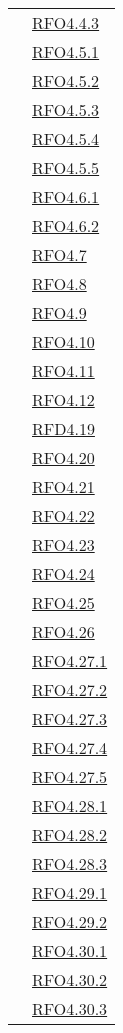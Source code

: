 \begin{longtable}{|>{\centering}m{5cm}|m{5cm}<{\centering}|}
& \hyperlink{RFO4.4.3}{RFO4.4.3}\\
& \hyperlink{RFO4.5.1}{RFO4.5.1}\\
& \hyperlink{RFO4.5.2}{RFO4.5.2}\\
& \hyperlink{RFO4.5.3}{RFO4.5.3}\\
& \hyperlink{RFO4.5.4}{RFO4.5.4}\\
& \hyperlink{RFO4.5.5}{RFO4.5.5}\\
& \hyperlink{RFO4.6.1}{RFO4.6.1}\\
& \hyperlink{RFO4.6.2}{RFO4.6.2}\\
& \hyperlink{RFO4.7}{RFO4.7}\\
& \hyperlink{RFO4.8}{RFO4.8}\\
& \hyperlink{RFO4.9}{RFO4.9}\\
& \hyperlink{RFO4.10}{RFO4.10}\\
& \hyperlink{RFO4.11}{RFO4.11}\\
& \hyperlink{RFO4.12}{RFO4.12}\\
& \hyperlink{RFD4.19}{RFD4.19}\\
& \hyperlink{RFO4.20}{RFO4.20}\\
& \hyperlink{RFO4.21}{RFO4.21}\\
& \hyperlink{RFO4.22}{RFO4.22}\\
& \hyperlink{RFO4.23}{RFO4.23}\\
& \hyperlink{RFO4.24}{RFO4.24}\\
& \hyperlink{RFO4.25}{RFO4.25}\\
& \hyperlink{RFO4.26}{RFO4.26}\\
& \hyperlink{RFO4.27.1}{RFO4.27.1}\\
& \hyperlink{RFO4.27.2}{RFO4.27.2}\\
& \hyperlink{RFO4.27.3}{RFO4.27.3}\\
& \hyperlink{RFO4.27.4}{RFO4.27.4}\\
& \hyperlink{RFO4.27.5}{RFO4.27.5}\\
& \hyperlink{RFO4.28.1}{RFO4.28.1}\\
& \hyperlink{RFO4.28.2}{RFO4.28.2}\\
& \hyperlink{RFO4.28.3}{RFO4.28.3}\\
& \hyperlink{RFO4.29.1}{RFO4.29.1}\\
& \hyperlink{RFO4.29.2}{RFO4.29.2}\\
& \hyperlink{RFO4.30.1}{RFO4.30.1}\\
& \hyperlink{RFO4.30.2}{RFO4.30.2}\\
& \hyperlink{RFO4.30.3}{RFO4.30.3}\\

\end{longtable}
